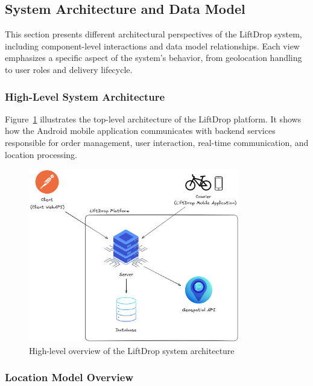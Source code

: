 \subsection{System Architecture and Data Model}

This section presents different architectural perspectives of the LiftDrop system, including component-level interactions and data model relationships. Each view emphasizes a specific aspect of the system's behavior, from geolocation handling to user roles and delivery lifecycle.

\subsubsection{High-Level System Architecture}

Figure~\ref{fig:high-level-Overview} illustrates the top-level architecture of the LiftDrop platform. It shows how the Android mobile application communicates with backend services responsible for order management, user interaction, real-time communication, and location processing.

\vspace{8mm}

\begin{figure}[H]
    \centering
    \includegraphics[width=0.82\textwidth]{images/LiftDrop_High_level_view.png}
    \caption{High-level overview of the LiftDrop system architecture}
    \label{fig:high-level-Overview}
\end{figure}

\newpage

\subsubsection{Location Model Overview}

